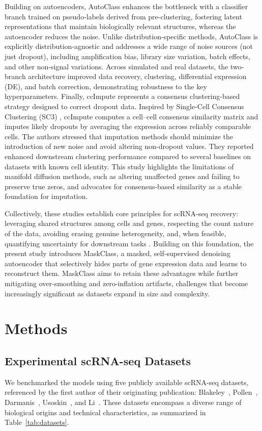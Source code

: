 \documentclass{article}
\theoremstyle{plain}
\theoremstyle{definition}
\theoremstyle{remark}
\begin{document}
Building on autoencoders, AutoClass enhances the bottleneck with a classifier branch trained on pseudo-labels derived from pre-clustering, fostering latent representations that maintain biologically relevant structures, whereas the autoencoder reduces the noise. Unlike distribution-specific methods, AutoClass is explicitly distribution-agnostic and addresses a wide range of noise sources (not just dropout), including amplification bias, library size variation, batch effects, and other non-signal variations. Across simulated and real datasets, the two-branch architecture improved data recovery, clustering, differential expression (DE), and batch correction, demonstrating robustness to the key hyperparameters. Finally, ccImpute represents a consensus clustering-based strategy designed to correct dropout data. Inspired by Single-Cell Consensus Clustering (SC3) \citep{Kiselev2017SC3}, ccImpute computes a cell–cell consensus similarity matrix and imputes likely dropouts by averaging the expression across reliably comparable cells. The authors stressed that imputation methods should minimize the introduction of new noise and avoid altering non-dropout values. They reported enhanced downstream clustering performance compared to several baselines on datasets with known cell identity. This study highlights the limitations of manifold diffusion methods, such as altering unaffected genes and failing to preserve true zeros, and advocates for consensus-based similarity as a stable foundation for imputation.

Collectively, these studies establish core principles for scRNA-seq recovery: leveraging shared structures among cells and genes, respecting the count nature of the data, avoiding erasing genuine heterogeneity, and, when feasible, quantifying uncertainty for downstream tasks \citep{Zheng2017TenX,Huang2018SAVER,Jiang2022ZeroInflationReview}. Building on this foundation, the present study introduces MaskClass, a masked, self-supervised denoising autoencoder that selectively hides parts of gene expression data and learns to reconstruct them. MaskClass aims to retain these advantages while further mitigating over-smoothing and zero-inflation artifacts, challenges that become increasingly significant as datasets expand in size and complexity.

\section{Methods}
\label{sec:methods}
\subsection{Experimental scRNA-seq Datasets}
We benchmarked the models using five publicly available scRNA-seq datasets, referenced by the first author of their originating publication: Blakeley~\cite{blakeley2015defining}, Pollen~\cite{pollen2014low}, Darmanis~\cite{darmanis2015survey}, Usoskin~\cite{usoskin2015unbiased}, and Li~\cite{li2017reference}. These datasets encompass a diverse range of biological origins and technical characteristics, as summarized in Table~\ref{tab:datasets}.
\end{document}
